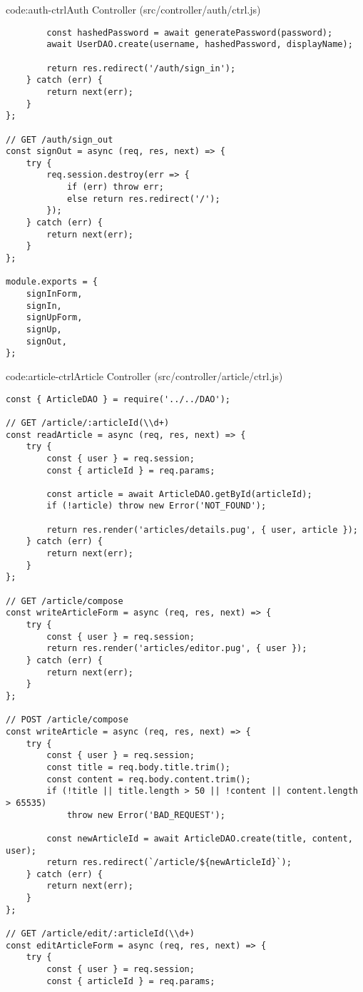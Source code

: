 \begin{code}{code:auth-ctrl}{Auth Controller (src/controller/auth/ctrl.js)}
\begin{verbatim}
        const hashedPassword = await generatePassword(password);
        await UserDAO.create(username, hashedPassword, displayName);

        return res.redirect('/auth/sign_in');
    } catch (err) {
        return next(err);
    }
};

// GET /auth/sign_out
const signOut = async (req, res, next) => {
    try {
        req.session.destroy(err => {
            if (err) throw err;
            else return res.redirect('/');
        });
    } catch (err) {
        return next(err);
    }
};

module.exports = {
    signInForm,
    signIn,
    signUpForm,
    signUp,
    signOut,
};
\end{verbatim}
\end{code}

\begin{code}{code:article-ctrl}{Article Controller (src/controller/article/ctrl.js)}
\begin{verbatim}
const { ArticleDAO } = require('../../DAO');

// GET /article/:articleId(\\d+)
const readArticle = async (req, res, next) => {
    try {
        const { user } = req.session;
        const { articleId } = req.params;

        const article = await ArticleDAO.getById(articleId);
        if (!article) throw new Error('NOT_FOUND');

        return res.render('articles/details.pug', { user, article });
    } catch (err) {
        return next(err);
    }
};

// GET /article/compose
const writeArticleForm = async (req, res, next) => {
    try {
        const { user } = req.session;
        return res.render('articles/editor.pug', { user });
    } catch (err) {
        return next(err);
    }
};

// POST /article/compose
const writeArticle = async (req, res, next) => {
    try {
        const { user } = req.session;
        const title = req.body.title.trim();
        const content = req.body.content.trim();
        if (!title || title.length > 50 || !content || content.length > 65535)
            throw new Error('BAD_REQUEST');

        const newArticleId = await ArticleDAO.create(title, content, user);
        return res.redirect(`/article/${newArticleId}`);
    } catch (err) {
        return next(err);
    }
};

// GET /article/edit/:articleId(\\d+)
const editArticleForm = async (req, res, next) => {
    try {
        const { user } = req.session;
        const { articleId } = req.params;


\end{verbatim}
\end{code}

